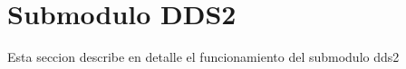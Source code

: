 \section{Submodulo DDS2}

Esta seccion describe en detalle el funcionamiento del submodulo dds2
\newpage
